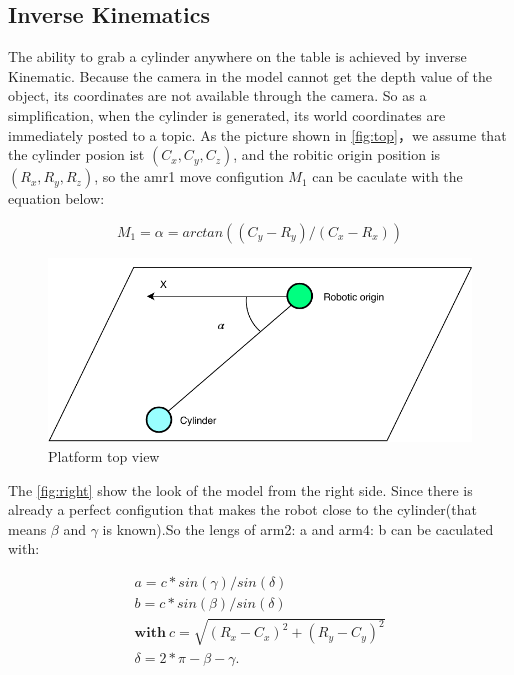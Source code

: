 \subsection{Inverse Kinematics}

The ability to grab a cylinder anywhere on the table is achieved by inverse Kinematic. Because the camera in the model cannot get the depth value of the object, its coordinates are not available through the camera. So as a simplification, when the cylinder is generated, its world coordinates are immediately posted to a topic. As the picture shown in \autoref{fig:top}，we assume that the cylinder posion ist $(C_x, C_y, C_z)$, and the robitic origin position is  $(R_x, R_y, R_z)$, so the amr1 move configution $M_1$ can be caculate with the equation below:


\begin{equation}
\label{simple_equation}
M_1=\alpha = arctan((C_y-R_y)/(C_x-R_x))
\end{equation}









\begin{figure}[htpb]
\centering
	\includegraphics[width=0.96\linewidth]{figures/top_view.pdf} 
	\caption{Platform top view}
	\vspace{-0.4cm}
	\label{fig:top}
\end{figure}


The \autoref{fig:right} show the look of the model from the right side. Since there is already a perfect configution that makes the robot close to the cylinder(that means $\beta$ and $\gamma$ is known).So the lengs of arm2: a and arm4: b can be caculated with:

\begin{equation}
\begin{aligned}
a=c*sin(\gamma)/sin(\delta)\\b=c*sin(\beta)/sin(\delta)\\ 
\textbf{with}\ c=\sqrt{(R_x-C_x)^2+(R_y-C_y)^2}\\\delta=2*\pi-\beta-\gamma.
\end{aligned}
\end{equation}



